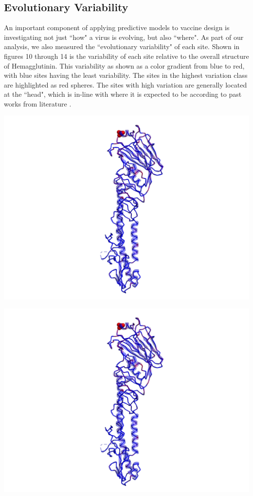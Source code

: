 \documentclass[12pt]{article}
\newenvironment{Figure}
  {\par\medskip\noindent\minipage{\linewidth}}
  {\endminipage\par\medskip}
\begin{document}
\begin{multicols}{2}
\subsection{Evolutionary Variability}

An important component of applying predictive models to vaccine design is investigating not just ``how" a virus is evolving, but also ``where". As part of our analysis, we also measured the ``evolutionary variability" of each site. Shown in figures 10 through 14 is the variability of each site relative to the overall structure of Hemagglutinin. This variability as shown as a color gradient from blue to red, with blue sites having the least variability. The sites in the highest variation class are highlighted as red spheres. The sites with high variation are generally located at the ``head", which is in-line with where it is expected to be according to past works from literature \citep{wiley1987structure}.
\begin{Figure}
 \centering
 \includegraphics[width=\linewidth]{subsample_0_viewA.png}
\end{Figure}
\begin{Figure}
 \centering
 \includegraphics[width=\linewidth]{subsample_1_viewA.png}

\end{Figure}
\end{multicols}
\end{document}
